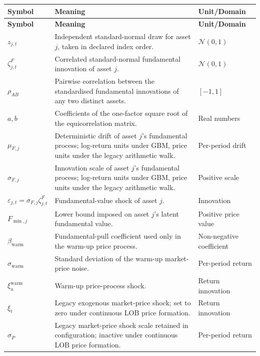 \documentclass[12pt, a4paper]{article}
\begin{document}
    \begin{longtable}{@{}L{0.22\textwidth}L{0.50\textwidth}L{0.20\textwidth}@{}}
        \toprule
        \textbf{Symbol} & \textbf{Meaning} & \textbf{Unit/Domain} \\
        \midrule
        \endfirsthead
        \toprule
        \textbf{Symbol} & \textbf{Meaning} & \textbf{Unit/Domain} \\
        \midrule
        \endhead
        \(z_{j,t}\) & Independent standard-normal draw for asset \(j\), taken in declared index order. & \(\mathcal{N}(0,1)\) \\
        \(\zeta_{j,t}^{F}\) & Correlated standard-normal fundamental innovation of asset \(j\). & \(\mathcal{N}(0,1)\) \\
        \(\rho_{AB}\) & Pairwise correlation between the standardised fundamental innovations of any two distinct assets. & \([-1,1]\) \\
        \(a,b\) & Coefficients of the one-factor square root of the equicorrelation matrix. & Real numbers \\
        \(\mu_{F,j}\) & Deterministic drift of asset \(j\)'s fundamental process; log-return units under GBM, price units under the legacy arithmetic walk. & Per-period drift \\
        \(\sigma_{F,j}\) & Innovation scale of asset \(j\)'s fundamental process; log-return units under GBM, price units under the legacy arithmetic walk. & Positive scale \\
        \(\varepsilon_{j,t}=\sigma_{F,j}\zeta_{j,t}^{F}\) & Fundamental-value shock of asset \(j\). & Innovation \\
        \(F_{\min,j}\) & Lower bound imposed on asset \(j\)'s latent fundamental value. & Positive price value \\
        \(\beta_{\mathrm{warm}}\) & Fundamental-pull coefficient used only in the warm-up price process. & Non-negative coefficient \\
        \(\sigma_{\mathrm{warm}}\) & Standard deviation of the warm-up market-price noise. & Per-period return \\
        \(\xi_u^{\mathrm{warm}}\) & Warm-up price-process shock. & Return innovation \\
        \(\xi_t\) & Legacy exogenous market-price shock; set to zero under continuous LOB price formation. & Return innovation \\
        \(\sigma_P\) & Legacy market-price shock scale retained in configuration; inactive under continuous LOB price formation. & Per-period return \\

\end{longtable}
\end{document}
